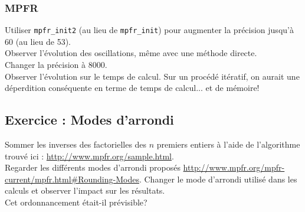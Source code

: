 \documentclass[a4paper,11pt]{exam}
\begin{document}
\subsubsection{MPFR}
Utiliser \verb=mpfr_init2= (au lieu de \verb=mpfr_init=) pour augmenter la précision jusqu'à 60 (au lieu de 53). \\
Observer l'évolution des oscillations, même avec une méthode directe. \\
Changer la précision à 8000. \\ Observer l'évolution sur le temps de calcul. Sur un procédé itératif, on aurait une déperdition conséquente en terme de temps de calcul... et de mémoire!

\subsection{Exercice \theenumi : Modes d'arrondi}
Sommer les inverses des factorielles des $n$ premiers entiers à l'aide de l'algorithme trouvé ici : \url{http://www.mpfr.org/sample.html}. \\
Regarder les différents modes d'arrondi proposés \url{http://www.mpfr.org/mpfr-current/mpfr.html#Rounding-Modes}.
Changer le mode d'arrondi utilisé dans les calculs et observer l'impact sur les résultats. \\ 
Cet ordonnancement était-il prévisible?
\end{document}
